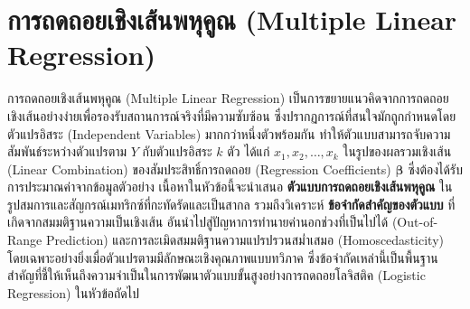 \section{การถดถอยเชิงเส้นพหุคูณ (Multiple Linear Regression)}
การถดถอยเชิงเส้นพหุคูณ (Multiple Linear Regression) เป็นการขยายแนวคิดจากการถดถอยเชิงเส้นอย่างง่ายเพื่อรองรับสถานการณ์จริงที่มีความซับซ้อน ซึ่งปรากฏการณ์ที่สนใจมักถูกกำหนดโดยตัวแปรอิสระ (Independent Variables) มากกว่าหนึ่งตัวพร้อมกัน ทำให้ตัวแบบสามารถจับความสัมพันธ์ระหว่างตัวแปรตาม $Y$ กับตัวแปรอิสระ $k$ ตัว ได้แก่ $x_1, x_2, \ldots, x_k$ ในรูปของผลรวมเชิงเส้น (Linear Combination) ของสัมประสิทธิ์การถดถอย (Regression Coefficients) $\boldsymbol{\beta}$ ซึ่งต้องได้รับการประมาณค่าจากข้อมูลตัวอย่าง เนื้อหาในหัวข้อนี้จะนำเสนอ \textbf{ตัวแบบการถดถอยเชิงเส้นพหุคูณ} ในรูปสมการและสัญกรณ์เมทริกซ์ที่กะทัดรัดและเป็นสากล รวมถึงวิเคราะห์ \textbf{ข้อจำกัดสำคัญของตัวแบบ} ที่เกิดจากสมมติฐานความเป็นเชิงเส้น อันนำไปสู่ปัญหาการทำนายค่านอกช่วงที่เป็นไปได้ (Out-of-Range Prediction) และการละเมิดสมมติฐานความแปรปรวนสม่ำเสมอ (Homoscedasticity) โดยเฉพาะอย่างยิ่งเมื่อตัวแปรตามมีลักษณะเชิงคุณภาพแบบทวิภาค ซึ่งข้อจำกัดเหล่านี้เป็นพื้นฐานสำคัญที่ชี้ให้เห็นถึงความจำเป็นในการพัฒนาตัวแบบขั้นสูงอย่างการถดถอยโลจิสติค (Logistic Regression) ในหัวข้อถัดไป


